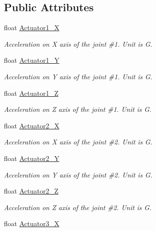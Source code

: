 \subsection*{Public Attributes}
\begin{DoxyCompactItemize}
\item 
float \hyperlink{structAngularAcceleration_a5cfc56b69d136bce62b14f2828db3850}{Actuator1\+\_\+X}
\begin{DoxyCompactList}\small\item\em Acceleration on X axis of the joint \#1. Unit is G. \end{DoxyCompactList}\item 
float \hyperlink{structAngularAcceleration_ae7137ba81e19e031606c67f9f675ebf4}{Actuator1\+\_\+Y}
\begin{DoxyCompactList}\small\item\em Acceleration on Y axis of the joint \#1. Unit is G. \end{DoxyCompactList}\item 
float \hyperlink{structAngularAcceleration_aae297625ad8f8f25a8e6ff44331ad369}{Actuator1\+\_\+Z}
\begin{DoxyCompactList}\small\item\em Acceleration on Z axis of the joint \#1. Unit is G. \end{DoxyCompactList}\item 
float \hyperlink{structAngularAcceleration_a203e9902f7e841db9df92d96082dbde7}{Actuator2\+\_\+X}
\begin{DoxyCompactList}\small\item\em Acceleration on X axis of the joint \#2. Unit is G. \end{DoxyCompactList}\item 
float \hyperlink{structAngularAcceleration_a64c0708882b11a7e05d8c893bea8f8e1}{Actuator2\+\_\+Y}
\begin{DoxyCompactList}\small\item\em Acceleration on Y axis of the joint \#2. Unit is G. \end{DoxyCompactList}\item 
float \hyperlink{structAngularAcceleration_a617d68c9abfc43629b2293e27370b539}{Actuator2\+\_\+Z}
\begin{DoxyCompactList}\small\item\em Acceleration on Z axis of the joint \#2. Unit is G. \end{DoxyCompactList}\item 
float \hyperlink{structAngularAcceleration_a687fb8bac7a0b529fbd07e7c5c17c281}{Actuator3\+\_\+X}

\end{DoxyCompactItemize}
